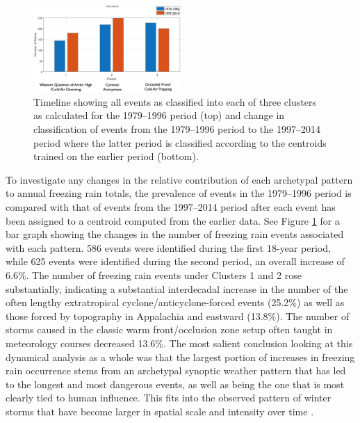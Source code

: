 \documentclass[twocol]{ametsoc}
\begin{document}
\begin{figure}
\centering
\includegraphics[width=0.5\textwidth]{Storm_Pattern_Change.png}
\caption{\label{fig:clusterchange} Timeline showing all events as classified into each of three clusters as calculated for the 1979--1996 period (top) and change in classification of events from the 1979--1996 period to the 1997--2014 period where the latter period is classified according to the centroids trained on the earlier period (bottom).}
\end{figure}

To investigate any changes in the relative contribution of each archetypal pattern to annual freezing rain totals, the prevalence of events in the 1979--1996 period is compared with that of events from the 1997--2014 period after each event has been assigned to a centroid computed from the earlier data. See Figure \ref{fig:clusterchange} for a bar graph showing the changes in the number of freezing rain events associated with each pattern. 586 events were identified during the first 18-year period, while 625 events were identified during the second period, an overall increase of 6.6\%. The number of freezing rain events under Clusters 1 and 2  rose substantially, indicating a substantial interdecadal increase in the number of the often lengthy extratropical cyclone/anticyclone-forced events (25.2\%) as well as those forced by topography in Appalachia and eastward (13.8\%). The number of storms caused in the classic warm front/occlusion zone setup often taught in meteorology courses decreased 13.6\%. The most salient conclusion looking at this dynamical analysis as a whole was that the largest portion of increases in freezing rain occurrence stems from an archetypal synoptic weather pattern that has led to the longest and most dangerous events, as well as being the one that is most clearly tied to human influence. This fits into the observed pattern of winter storms that have become larger in spatial scale and intensity over time \citep{changnon2007catastrophic}. 
\end{document}
